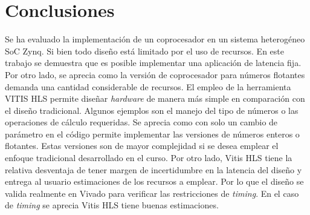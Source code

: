\documentclass[conference]{IEEEtran}
\begin{document}
\section{Conclusiones}
Se ha evaluado la implementación de un coprocesador en un sistema heterogéneo SoC Zynq. Si bien todo diseño está limitado por el uso de recursos. En este trabajo se demuestra que es posible implementar una aplicación de latencia fija. Por otro lado, se aprecia como la versión de coprocesador para números flotantes demanda una cantidad considerable de recursos. El empleo de la herramienta VITIS HLS permite diseñar \textit{hardware} de manera más simple en comparación con el diseño tradicional. Algunos ejemplos son  el manejo del tipo de números o las operaciones de cálculo requeridas.  Se aprecia como con solo un cambio de parámetro en el código permite implementar las versiones de números enteros o flotantes. Estas versiones son de mayor complejidad si se desea emplear el enfoque tradicional desarrollado en el curso. Por otro lado, Vitis HLS tiene la relativa desventaja de tener margen de incertidumbre en la latencia del diseño y entrega al usuario estimaciones de los recursos a emplear. Por lo que el diseño se valida realmente en Vivado para verificar las restricciones de \textit{timing}. En el caso de \textit{timing} se aprecia  Vitis HLS tiene buenas estimaciones.  










\end{document}
